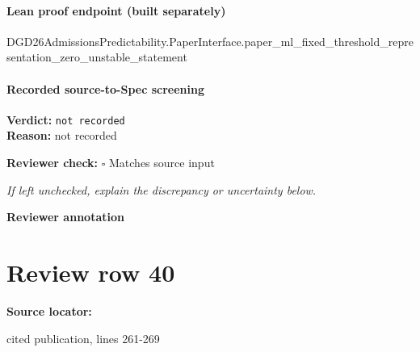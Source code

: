 \documentclass[10pt]{article}
\newcommand{\reviewerbox}{%
  \par\noindent\fbox{\parbox{0.96\linewidth}{\rule{0pt}{0.38in}}}\par
}
\newcommand{\reviewmatch}[1]{%
  \par\noindent\textbf{Reviewer check:} $\square$\; #1\par
  \noindent\emph{If left unchecked, explain the discrepancy or uncertainty below.}\par
}
\begin{document}
\paragraph{Lean proof endpoint (built separately)}\begin{ReviewVerbatim}
DGD26AdmissionsPredictability.PaperInterface.paper_ml_fixed_threshold_representation_zero_unstable_statement
\end{ReviewVerbatim}

\paragraph{Recorded source-to-Spec screening}
\textbf{Verdict:} \texttt{not recorded}
\\
\textbf{Reason:} not recorded
\reviewmatch{Matches source input}
\noindent\textbf{Reviewer annotation}\par
\reviewerbox
\clearpage
\hypertarget{source-claim-d21050cec8d233b0}{}
\section*{Review row 40}
\textbf{Source locator:} {\footnotesize\raggedright cited publication, lines 261-\allowbreak{}269\par}
\end{document}
